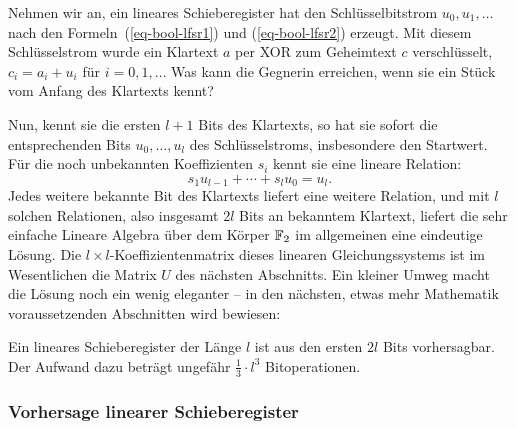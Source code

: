 \begin{refsegment}
Nehmen wir an, ein lineares
Schieberegister
hat den Schlüsselbitstrom $u_0, u_1, \ldots$ nach den
Formeln~(\ref{eq-bool-lfsr1}) und (\ref{eq-bool-lfsr2}) erzeugt.
Mit diesem Schlüsselstrom wurde ein
Klartext $a$ per XOR
zum Geheimtext $c$ verschlüsselt, $c_i = a_i + u_i$
für $i = 0, 1, \ldots$ Was kann die Gegnerin erreichen, wenn sie ein
Stück vom Anfang des Klartexts kennt?

Nun, kennt sie die ersten $l+1$ Bits des Klartexts, so hat sie sofort
die entsprechenden Bits $u_0, \ldots, u_l$ des Schlüsselstroms,
insbesondere den Startwert. Für die noch unbekannten Koeffizienten
$s_i$ kennt sie eine lineare Relation:
\[
     s_1 u_{l-1} + \cdots + s_l u_0 = u_l.
\]
Jedes weitere bekannte Bit des Klartexts liefert eine weitere Relation,
und mit $l$ solchen Relationen, also insgesamt $2l$ Bits an bekanntem
Klartext, liefert die sehr einfache Lineare
Algebra über dem Körper
$\mathbb{F}_2$ im allgemeinen eine eindeutige Lösung. Die
$l \times l$-Koeffizientenmatrix dieses linearen
Gleichungssystems
ist im Wesentlichen die Matrix $U$ des nächsten Abschnitts. Ein
kleiner Umweg macht die Lösung noch ein wenig eleganter -- in den nächsten,
etwas mehr Mathematik voraussetzenden Abschnitten wird bewiesen:

\begin{satz}\label{thm-bool-lfsr}
  Ein lineares Schieberegister
  der Länge $l$ ist aus den ersten $2l$ Bits
  vorhersagbar. Der Aufwand dazu beträgt ungefähr $\frac{1}{3} \cdot l^3$
  Bitoperationen.
\end{satz}

\subsubsection*{Vorhersage linearer Schieberegister}


\end{refsegment}

